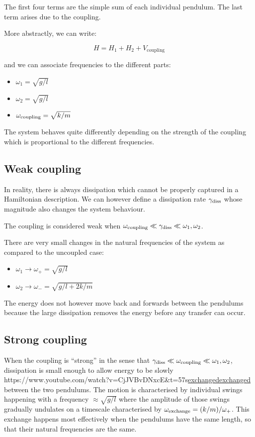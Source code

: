 \documentclass[
]{article}
\let\oldhref\href
\renewcommand{\href}[2]{\ifx#1\urlprefix\oldhref{#1}{#2}\else\uline{\oldhref{#1}{#2}}\fi}
\renewcommand{\[}{\begin{equation}}
\renewcommand{\]}{\end{equation}}
\providecommand{\tightlist}{%
  \setlength{\itemsep}{0pt}\setlength{\parskip}{0pt}}
\begin{document}
The first four terms are the simple sum of each individual pendulum. The
last term arises due to the coupling.

More abstractly, we can write:

\[
H = H_1 + H_2+ V_{\text{coupling}}
\]

and we can associate frequencies to the different parts:

\begin{itemize}
\tightlist
\item
  \(\omega_1 = \sqrt{g/l}\)
\item
  \(\omega_2 = \sqrt{g/l}\)
\item
  \(\omega_{\rm coupling} = \sqrt{k/m}\)
\end{itemize}

The system behaves quite differently depending on the strength of the
coupling which is proportional to the different frequencies.

\subsection{Weak coupling}\label{weak-coupling}

In reality, there is always dissipation which cannot be properly
captured in a Hamiltonian description. We can however define a
dissipation rate \(\gamma_{\rm diss}\) whose magnitude also changes the
system behaviour.

The coupling is considered weak when
\(\omega_{\rm coupling} \ll \gamma_{\rm diss} \ll \omega_1,\omega_2\).

There are very small changes in the natural frequencies of the system as
compared to the uncoupled case:

\begin{itemize}
\tightlist
\item
  \(\omega_1 \rightarrow \omega_+ = \sqrt{g/l}\)
\item
  \(\omega_2 \rightarrow \omega_- = \sqrt{g/l + 2k/m}\)
\end{itemize}

The energy does not however move back and forwards between the pendulums
because the large dissipation removes the energy before any transfer can
occur.

\subsection{Strong coupling}\label{strong-coupling}

When the coupling is ``strong'' in the sense that
\(\gamma_{\rm diss} \ll \omega_{\rm coupling} \ll \omega_1,\omega_2\),
dissipation is small enough to allow energy to be slowly
\href{https://www.youtube.com/watch?v=CjJVBvDNxcE&t=57s}{exchanged}
between the two pendulums. The motion is characterised by individual
swings happening with a frequency \(\approx \sqrt{g/l}\) where the
amplitude of those swings gradually undulates on a timescale
characterised by \(\omega_{\rm exchange} =  (k/m) / \omega_+\). This
exchange happens most effectively when the pendulums have the same
length, so that their natural frequencies are the same.
\end{document}
